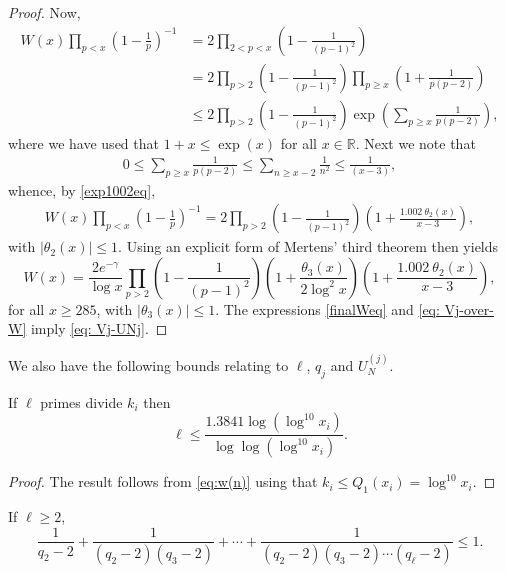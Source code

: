 \documentclass[12pt]{amsart}
\begin{document}
\begin{proof}
Now,
\begin{align*}
    W(x) \prod_{p < x} \left( 1 - \frac{1}{p}\right)^{-1} &= 2 \prod_{2 < p < x} \left( 1 - \frac{1}{(p-1)^2} \right)\\
    &= 2 \prod_{p > 2} \left( 1 - \frac{1}{(p-1)^2} \right) \prod_{p \ge x} \left( 1 + \frac{1}{p(p-2)} \right) \\
    &\le 2 \prod_{p > 2} \left( 1 - \frac{1}{(p-1)^2} \right) \exp \left( \sum_{p \ge x} \frac{1}{p(p-2)} \right),
\end{align*}
where we have used that $1+x\leq \exp(x)$ for all $x\in\mathbb{R}$. Next we note that
\begin{align*}
    0 \le \sum_{p \ge x} \frac{1}{p(p-2)} \le \sum_{n \ge x-2} \frac{1}{n^2} \le \frac{1}{(x-3)},
\end{align*}
whence, by \eqref{exp1002eq},
\begin{align*}
    W(x) \prod_{p < x} \left( 1 - \frac{1}{p}\right)^{-1} = 2 \prod_{p > 2} \left( 1 - \frac{1}{(p-1)^2} \right) \left( 1 + \frac{1.002~\theta_2(x)}{x-3} \right),
\end{align*}
with $|\theta_2(x)| \le 1$. Using an explicit form of Mertens' third theorem \cite[Theorem 7]{R-S} then yields
\begin{equation}\label{finalWeq}
    W(x) = \frac{2e^{-\gamma}}{\log x} \prod_{p > 2} \left( 1 - \frac{1}{(p-1)^2} \right) \left( 1 + \frac{\theta_3(x)}{2 \log^2 x} \right) \left( 1 + \frac{1.002~\theta_2(x)}{x-3} \right),
\end{equation}
for all $x\geq 285$, with $|\theta_3(x)| \leq 1$. The expressions \eqref{finalWeq} and \eqref{eq: Vj-over-W} imply \eqref{eq: Vj-UNj}.
\end{proof}
We also have the following bounds relating to $\ell$, $q_j$ and $U_N^{(j)}$.
\begin{lemma}\label{elllem}
If $\ell$ primes divide $k_i$ then
\begin{equation}
\label{eq:l}
\ell \le \frac{1.3841 \log (\log^{10} x_i)}{\log \log (\log^{10} x_i)}.
\end{equation}
\end{lemma}
\begin{proof}
The result follows from \eqref{eq:w(n)} using that $k_i \le Q_1(x_i)=\log^{10} x_i$.
\end{proof}
\begin{lemma}\label{leq1lem}
    If $\ell\ge 2$,
    \begin{equation*} 
        \frac{1}{q_2-2}+\frac{1}{(q_2-2)(q_3-2)}+\cdots+\frac{1}{(q_2-2)(q_3-2)\cdots(q_\ell-2)}\le 1.
    \end{equation*}
\end{lemma}
\end{document}
